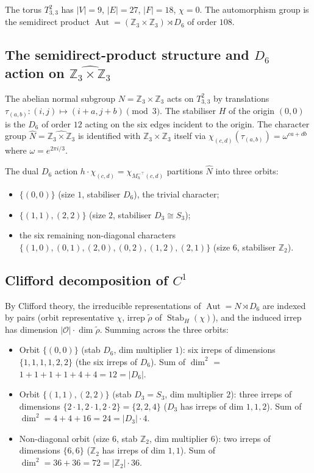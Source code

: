 \documentclass[12pt,a4paper]{article}
\theoremstyle{definition}
\theoremstyle{remark}
\newcommand{\bZ}{\mathbb{Z}}
\DeclareMathOperator{\Aut}{Aut}
\DeclareMathOperator{\Stab}{Stab}
\begin{document}
The torus $T^2_{3,3}$ has $|V| = 9$, $|E| = 27$, $|F| = 18$, $\chi = 0$.
The automorphism group is the semidirect product
$\Aut = (\bZ_3 \times \bZ_3) \rtimes D_6$ of order $108$.

\subsection{The semidirect-product structure and $D_6$ action on
$\widehat{\bZ_3 \times \bZ_3}$}\label{sec:torus-semidirect}

The abelian normal subgroup $N = \bZ_3 \times \bZ_3$ acts on $T^2_{3,3}$ by
translations $\tau_{(a,b)}\colon (i, j) \mapsto (i + a, j + b) \pmod 3$. The
stabiliser $H$ of the origin $(0, 0)$ is the $D_6$ of order $12$ acting on
the six edges incident to the origin. The character group
$\widehat N = \widehat{\bZ_3 \times \bZ_3}$ is identified with $\bZ_3 \times
\bZ_3$ itself via $\chi_{(c,d)}(\tau_{(a,b)}) = \omega^{ca + db}$ where
$\omega = e^{2\pi i / 3}$.

The dual $D_6$ action $h \cdot \chi_{(c,d)} = \chi_{M_h^{-\top}(c,d)}$
partitions $\widehat N$ into three orbits:
\begin{itemize}\setlength{\itemsep}{0pt}
\item $\{(0, 0)\}$ (size $1$, stabiliser $D_6$), the trivial character;
\item $\{(1, 1), (2, 2)\}$ (size $2$, stabiliser $D_3 \cong S_3$);
\item the six remaining non-diagonal characters
  $\{(1, 0), (0, 1), (2, 0), (0, 2), (1, 2), (2, 1)\}$
  (size $6$, stabiliser $\bZ_2$).
\end{itemize}

\subsection{Clifford decomposition of $C^1$}\label{sec:torus-decomp}

By Clifford theory, the irreducible representations of $\Aut = N \rtimes
D_6$ are indexed by pairs (orbit representative $\chi$, irrep $\tilde\rho$
of $\Stab_H(\chi)$), and the induced irrep has dimension $|\mathcal O|
\cdot \dim \tilde\rho$. Summing across the three orbits:
\begin{itemize}\setlength{\itemsep}{0pt}
\item Orbit $\{(0,0)\}$ (stab $D_6$, dim multiplier $1$): six irreps of
  dimensions $\{1, 1, 1, 1, 2, 2\}$ (the six irreps of $D_6$). Sum of
  $\dim^2$ = $1 + 1 + 1 + 1 + 4 + 4 = 12 = |D_6|$.
\item Orbit $\{(1,1), (2,2)\}$ (stab $D_3 = S_3$, dim multiplier $2$):
  three irreps of dimensions $\{2 \cdot 1, 2 \cdot 1, 2 \cdot 2\} = \{2, 2, 4\}$
  ($D_3$ has irreps of dim $1, 1, 2$). Sum of $\dim^2 = 4 + 4 + 16 = 24
  = |D_3| \cdot 4$.
\item Non-diagonal orbit (size $6$, stab $\bZ_2$, dim multiplier $6$): two
  irreps of dimensions $\{6, 6\}$ ($\bZ_2$ has irreps of dim $1, 1$). Sum
  of $\dim^2 = 36 + 36 = 72 = |\bZ_2| \cdot 36$.
\end{itemize}
\end{document}
